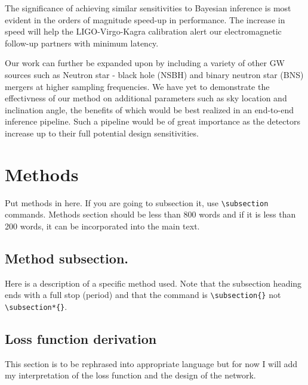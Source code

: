 \documentclass[%
showpacs,
 amsmath,amssymb,
 aps,
 twocolumn,
 prl,
 reprint,
floatfix,
]{revtex4-1}
\begin{document}
The significance of achieving similar sensitivities 
to Bayesian inference is most evident in the 
orders of magnitude speed-up in performance. The increase
in speed will help the LIGO-Virgo-Kagra calibration 
alert our electromagnetic follow-up partners with 
minimum latency.

Our work can further be expanded upon by including 
a variety of other GW sources such as Neutron star - 
black hole (NSBH) and binary neutron star (BNS) mergers 
at higher sampling frequencies. We have yet to demonstrate 
the effectivness of our method on additional parameters 
such as sky location and inclination angle, the benefits of which 
would be best realized in an end-to-end inference pipeline. 
Such a pipeline would be of great importance as the detectors 
increase up to their full potential design sensitivities.

\section{Methods}
Put methods in here.  If you are going to subsection it, use
\verb|\subsection| commands.  Methods section should be less than
800 words and if it is less than 200 words, it can be incorporated
into the main text.

\subsection{Method subsection.}

Here is a description of a specific method used.  Note that the
subsection heading ends with a full stop (period) and that the
command is \verb|\subsection{}| not \verb|\subsection*{}|.

\subsection{Loss function derivation}

This section is to be rephrased into appropriate language but for now I will
add my interpretation of the loss function and the design of the network.
\end{document}
